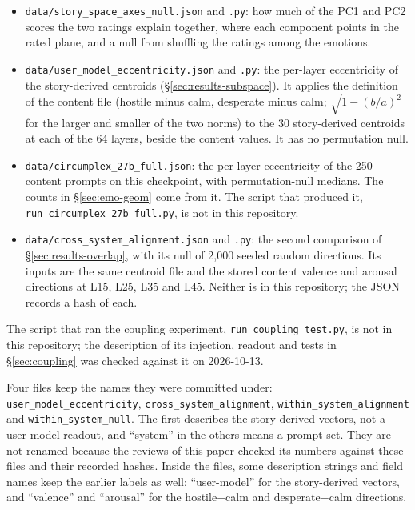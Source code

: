 \documentclass[11pt,a4paper]{article}
\begin{document}
\begin{itemize}
  \item \texttt{data/\allowbreak story\_space\_axes\_null.json} and \texttt{.py}: how much of the PC1 and PC2 scores the two ratings explain together, where each component points in the rated plane, and a null from shuffling the ratings among the emotions.
  \item \texttt{data/\allowbreak user\_model\_eccentricity.json} and \texttt{.py}: the per-layer eccentricity of the story-derived centroids (\S\ref{sec:results-subspace}). It applies the definition of the content file (hostile minus calm, desperate minus calm; $\sqrt{1 - (b/a)^2}$ for the larger and smaller of the two norms) to the 30 story-derived centroids at each of the 64 layers, beside the content values. It has no permutation null.
  \item \texttt{data/\allowbreak circumplex\_27b\_full.json}: the per-layer eccentricity of the 250 content prompts on this checkpoint, with permutation-null medians. The counts in \S\ref{sec:emo-geom} come from it. The script that produced it, \texttt{run\_circumplex\_27b\_full.py}, is not in this repository.
  \item \texttt{data/\allowbreak cross\_system\_alignment.json} and \texttt{.py}: the second comparison of \S\ref{sec:results-overlap}, with its null of 2,000 seeded random directions. Its inputs are the same centroid file and the stored content valence and arousal directions at L15, L25, L35 and L45. Neither is in this repository; the JSON records a hash of each.
\end{itemize}

The script that ran the coupling experiment, \texttt{run\_coupling\_test.py}, is not in this repository; the description of its injection, readout and tests in \S\ref{sec:coupling} was checked against it on 2026-10-13.

Four files keep the names they were committed under: \texttt{user\_model\_eccentricity}, \texttt{cross\_system\_alignment}, \texttt{within\_system\_alignment} and \texttt{within\_system\_null}. The first describes the story-derived vectors, not a user-model readout, and ``system'' in the others means a prompt set. They are not renamed because the reviews of this paper checked its numbers against these files and their recorded hashes. Inside the files, some description strings and field names keep the earlier labels as well: ``user-model'' for the story-derived vectors, and ``valence'' and ``arousal'' for the hostile$-$calm and desperate$-$calm directions.

\fussy
\end{document}
